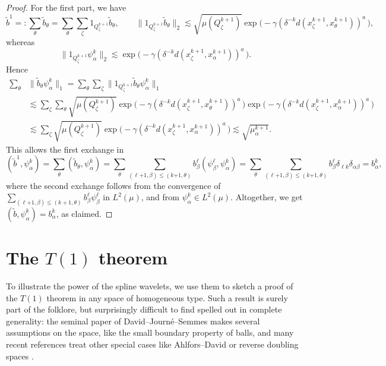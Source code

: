 \documentclass{amsart}
\numberwithin{equation}{section}
\theoremstyle{plain}
\theoremstyle{definition}
\theoremstyle{remark}
\begin{document}
{{{\begin{proof}
For the first part, we have
\begin{equation*}
  \tilde{b}^1=:\sum_\theta\tilde{b}_\theta=\sum_\theta\sum_\zeta 1_{Q^{k+1}_\zeta}\tilde{b}_\theta,\qquad
  {\|{1_{Q^{k+1}_\zeta}\tilde{b}_\theta}\|_{{2}}}\lesssim\sqrt{\mu(Q^{k+1}_\zeta)}\exp\big(-\gamma(\delta ^{-k}{d(x^{k+1}_\zeta,x^{k+1}_\theta)})^a\, \big),
\end{equation*}
whereas
\begin{equation*}
  {\|{1_{Q^{k+1}_\zeta}\psi^k_\alpha}\|_{{2}}}\lesssim\exp\big(-\gamma(\delta ^{-k}{d(x^{k+1}_\zeta,x^{k+1}_\alpha)})^a\, \big).
\end{equation*}
Hence
\begin{align*}
 \sum_\theta &\|\tilde b_\theta\psi^k_\alpha\|_1
  =\sum_\theta\sum_\zeta\|1_{Q^{k+1}_\zeta}\tilde b_\theta\psi^k_\alpha\|_1\\
  &\lesssim\sum_\zeta\sum_\theta\sqrt{\mu(Q^{k+1}_\zeta)}
    \exp\big(-\gamma(\delta ^{-k}{d(x^{k+1}_\zeta,x^{k+1}_\theta)})^a\, \big)\exp\big(-\gamma(\delta ^{-k}{d(x^{k+1}_\zeta,x^{k+1}_\alpha)})^a\, \big) \\
  &\lesssim\sum_\zeta\sqrt{\mu(Q^{k+1}_\zeta)}\exp\big(-\gamma(\delta ^{-k}{d(x^{k+1}_\zeta,x^{k+1}_\alpha)})^a\, \big)\lesssim\sqrt{\mu^{k+1}_\alpha}.
\end{align*}
This allows the first exchange in
\begin{equation*}
  (\tilde{b}^1,\psi^k_\alpha)
  =\sum_\theta(\tilde{b}_\theta,\psi^k_\alpha)
  =\sum_\theta\sum_{(\ell{+1},\beta)\leq(k{+1},\theta)}b^\ell_\beta(\psi^\ell_\beta,\psi^k_\alpha)
  =\sum_\theta\sum_{(\ell{+1},\beta)\leq(k {+1},\theta)}b^\ell_\beta\delta_{\ell k}\delta_{\alpha\beta}
  =b^k_\alpha,
\end{equation*}
where the second exchange follows from the convergence of $\sum_{(\ell{+1},\beta)\leq(k+1,\theta)}b^\ell_\beta\psi^\ell_\beta$ in $L^2(\mu)$, and from $\psi^k_\alpha\in L^2(\mu)$. Altogether, we get $(\tilde{b},\psi^k_\alpha)=b^k_\alpha$, as claimed.
\end{proof}

 
\section{The $T(1)$ theorem}

{
To illustrate the power of the spline wavelets, we use them to sketch a proof of the $T(1)$ theorem in any space of homogeneous type. Such a result is surely part of the folklore, but surprisingly difficult to find spelled out in complete generality:  the seminal paper of David--Journ\'e--Semmes \cite{DJS}  makes several assumptions on the space, like the small boundary property of balls, and many recent references treat other special cases like Ahlfors--David \cite{DH} or reverse doubling spaces \cite{HMY1}.

}}}}
\end{document}
